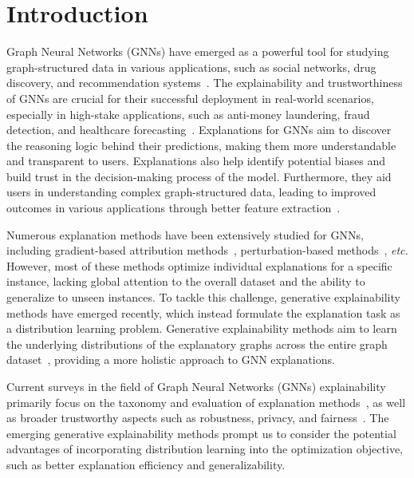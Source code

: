 \section{Introduction}
Graph Neural Networks (GNNs) have emerged as a powerful tool for studying graph-structured data in various applications, such as social networks, drug discovery, and recommendation systems~\cite{GNN_application, GNN_anomaly, GNN_financial, GNN_financial_time_series,GNN_molecule, GNN_molecule_review, GNN_socialnetwork}. The explainability and trustworthiness of GNNs are crucial for their successful deployment in real-world scenarios, especially in high-stake applications, such as anti-money laundering, fraud detection, and healthcare forecasting~\cite{Graph-SST2,explainability_GCN, Evaluate_explainability}. Explanations for GNNs aim to discover the reasoning logic behind their predictions, making them more understandable and transparent to users. Explanations also help identify potential biases and build trust in the decision-making process of the model. Furthermore, they aid users in understanding complex graph-structured data, leading to improved outcomes in various applications through better feature extraction~\cite{survey_zhang,Dai:survey,Survey_trustworthy}.

Numerous explanation methods have been extensively studied for GNNs, including gradient-based attribution methods~\cite{Grad-CAM-Graph, SA-Graph, IG}, perturbation-based methods~\cite{GNNExplainer, ReFine, SubgraphX,GraphMask, GraphLIME}, \textit{etc.} However, most of these methods optimize individual explanations for a specific instance, lacking global attention to the overall dataset and the ability to generalize to unseen instances. To tackle this challenge, generative explainability methods have emerged recently, which instead formulate the explanation task as a distribution learning problem. Generative explainability methods aim to learn the underlying distributions of the explanatory graphs across the entire graph dataset~\cite{RCExplainer, GFlowExplainer, CLEAR, XGNN}, providing a more holistic approach to GNN explanations.

Current surveys in the field of Graph Neural Networks (GNNs) explainability primarily focus on the taxonomy and evaluation of explanation methods~\cite{Graph-SST2, Evaluate_explainability, Survey_counterfactual}, as well as broader trustworthy aspects such as robustness, privacy, and fairness~\cite{survey_cyber, survey_zhang, Survey_li, Survey_trustworthy}. 
The emerging generative explainability methods prompt us to consider the potential advantages of incorporating distribution learning into the optimization objective, such as better explanation efficiency and generalizability.



